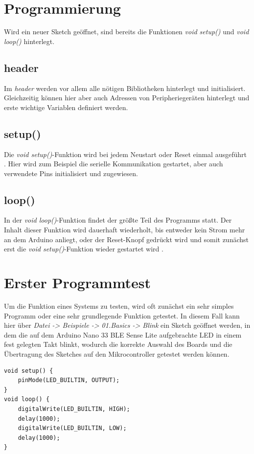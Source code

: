 \section{Programmierung}
Wird ein neuer Sketch geöffnet, sind bereits die Funktionen \textit{void setup()} und \textit{void loop()} hinterlegt.

\subsection{header}
Im \textit{header} werden vor allem alle nötigen Bibliotheken hinterlegt und initialisiert. Gleichzeitig können hier aber auch Adressen von Peripheriegeräten hinterlegt und erste wichtige Variablen definiert werden.

\subsection{setup()}
Die \textit{void setup()}-Funktion wird bei jedem Neustart oder Reset einmal ausgeführt \cite{Arduino.2024d}.
Hier wird zum Beispiel die serielle Kommunikation gestartet, aber auch verwendete Pins initialisiert und zugewiesen.

\subsection{loop()}
In der \textit{void loop()}-Funktion findet der größte Teil des Programms statt. Der Inhalt dieser Funktion wird dauerhaft wiederholt, bis entweder kein Strom mehr an dem Arduino anliegt, oder der Reset-Knopf gedrückt wird und somit zunächst erst die \textit{void setup()}-Funktion wieder gestartet wird \cite{Arduino.2024e}.

\section{Erster Programmtest}
Um die Funktion eines Systems zu testen, wird oft zunächst ein sehr simples Programm oder eine sehr grundlegende Funktion getestet.
In diesem Fall kann hier über \textit{Datei -> Beispiele -> 01.Basics -> Blink} ein Sketch geöffnet werden, in dem die auf dem Arduino Nano 33 BLE Sense Lite aufgebrachte LED in einem fest gelegten Takt blinkt, wodurch die korrekte Auswahl des Boards und die Übertragung des Sketches auf den Mikrocontroller getestet werden können.

\begin{lstlisting}
void setup() {
	pinMode(LED_BUILTIN, OUTPUT);
}
void loop() {
	digitalWrite(LED_BUILTIN, HIGH);
	delay(1000);                     
	digitalWrite(LED_BUILTIN, LOW);  
	delay(1000);                     
}
\end{lstlisting}

